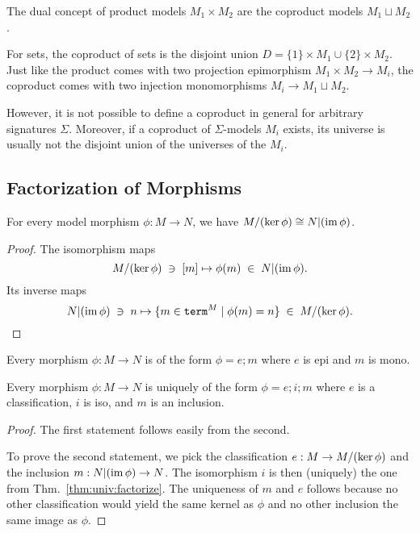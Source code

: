 The dual concept of product models $M_1\times M_2$ are the coproduct models $M_1\sqcup M_2$.

For sets, the coproduct of sets is the disjoint union $D=\{1\}\times M_1\cup \{2\}\times M_2$.
Just like the product comes with two projection epimorphism $M_1\times M_2\to M_i$, the coproduct comes with two injection monomorphisms $M_i\to M_1\sqcup M_2$.

However, it is not possible to define a coproduct in general for arbitrary signatures $\Sigma$.
Moreover, if a coproduct of $\Sigma$-models $M_i$ exists, its universe is usually not the disjoint union of the universes of the $M_i$.

\subsection{Factorization of Morphisms}

\begin{theorem}\label{thm:univ:factorize}
For every model morphism $\phi:M\to N$, we have $M/(\mathrm{ker}\, \phi)\cong N|(\mathrm{im}\, \phi)$.
\end{theorem}
\begin{proof}
The isomorphism maps \[M/(\mathrm{ker}\, \phi) \;\ni\;[m] \mapsto \phi(m) \;\in\;  N|(\mathrm{im}\, \phi).\]
Its inverse maps \[N|(\mathrm{im}\, \phi)\;\ni\; n \mapsto \{m\in\mathtt{term}^M\;|\;\phi(m)=n\}\;\in\; M/(\mathrm{ker}\, \phi).\]
\end{proof}

\begin{theorem}\label{thm:univ:factorize2}
Every morphism $\phi:M\to N$ is of the form $\phi=e;m$ where $e$ is epi and $m$ is mono.

Every morphism $\phi:M\to N$ is uniquely of the form $\phi=e;i;m$ where $e$ is a classification, $i$ is iso, and $m$ is an inclusion.
\end{theorem}
\begin{proof}
The first statement follows easily from the second.

To prove the second statement, we pick the classification $e:M\to M/(\mathrm{ker}\, \phi)$ and the inclusion $m:N|(\mathrm{im}\, \phi)\to N$.
The isomorphism $i$ is then (uniquely) the one from Thm.~\ref{thm:univ:factorize}.
The uniqueness of $m$ and $e$ follows because no other classification would yield the same kernel as $\phi$ and no other inclusion the same image as $\phi$.
\end{proof}